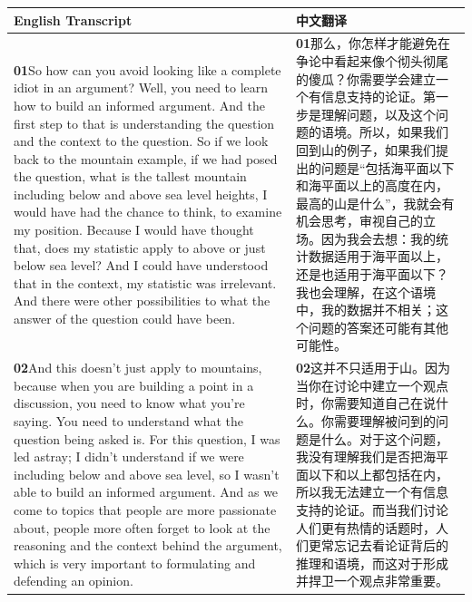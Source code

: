 \documentclass[UTF8,zihao=-4,fontset=fandol]{ctexart}
\newcommand{\TranscriptColumn}{\raggedright\arraybackslash\hyphenpenalty=10000\exhyphenpenalty=10000\sloppy}
\begin{document}
\renewcommand{\arraystretch}{1.23}
\begin{longtable}{>{\TranscriptColumn}p{} >{\TranscriptColumn}p{}}
\rowcolor{headerBg}\textbf{English Transcript} & \textbf{中文翻译} \\ \hline
\textbf{01}\quad So how can you avoid looking like a complete idiot in an argument? Well, you need to learn how to build an informed argument. And the first step to that is understanding the question and the context to the question. So if we look back to the mountain example, if we had posed the question, what is the tallest mountain including below and above sea level heights, I would have had the chance to think, to examine my position. Because I would have thought that, does my statistic apply to above or just below sea level? And I could have understood that in the context, my statistic was irrelevant. And there were other possibilities to what the answer of the question could have been. & \textbf{01}\quad 那么，你怎样才能避免在争论中看起来像个彻头彻尾的傻瓜？你需要学会建立一个有信息支持的论证。第一步是理解问题，以及这个问题的语境。所以，如果我们回到山的例子，如果我们提出的问题是“包括海平面以下和海平面以上的高度在内，最高的山是什么”，我就会有机会思考，审视自己的立场。因为我会去想：我的统计数据适用于海平面以上，还是也适用于海平面以下？我也会理解，在这个语境中，我的数据并不相关；这个问题的答案还可能有其他可能性。 \\ \hline
\textbf{02}\quad And this doesn't just apply to mountains, because when you are building a point in a discussion, you need to know what you're saying. You need to understand what the question being asked is. For this question, I was led astray; I didn't understand if we were including below and above sea level, so I wasn't able to build an informed argument. And as we come to topics that people are more passionate about, people more often forget to look at the reasoning and the context behind the argument, which is very important to formulating and defending an opinion. & \textbf{02}\quad 这并不只适用于山。因为当你在讨论中建立一个观点时，你需要知道自己在说什么。你需要理解被问到的问题是什么。对于这个问题，我没有理解我们是否把海平面以下和以上都包括在内，所以我无法建立一个有信息支持的论证。而当我们讨论人们更有热情的话题时，人们更常忘记去看论证背后的推理和语境，而这对于形成并捍卫一个观点非常重要。 \\ \hline

\end{longtable}
\end{document}
